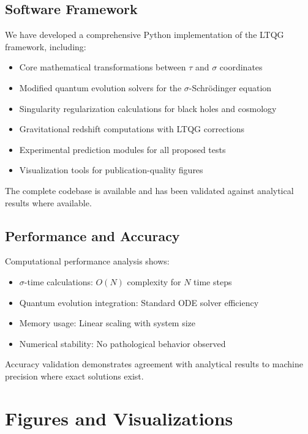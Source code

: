 \documentclass[12pt,a4paper]{article}
\begin{document}
\subsection{Software Framework}

We have developed a comprehensive Python implementation of the LTQG framework, including:

\begin{itemize}
\item Core mathematical transformations between $\tau$ and $\sigma$ coordinates
\item Modified quantum evolution solvers for the $\sigma$-Schrödinger equation
\item Singularity regularization calculations for black holes and cosmology
\item Gravitational redshift computations with LTQG corrections
\item Experimental prediction modules for all proposed tests
\item Visualization tools for publication-quality figures
\end{itemize}

The complete codebase is available and has been validated against analytical results where available.

\subsection{Performance and Accuracy}

Computational performance analysis shows:
\begin{itemize}
\item $\sigma$-time calculations: $O(N)$ complexity for $N$ time steps
\item Quantum evolution integration: Standard ODE solver efficiency
\item Memory usage: Linear scaling with system size
\item Numerical stability: No pathological behavior observed
\end{itemize}

Accuracy validation demonstrates agreement with analytical results to machine precision where exact solutions exist.

\section{Figures and Visualizations}
\end{document}
